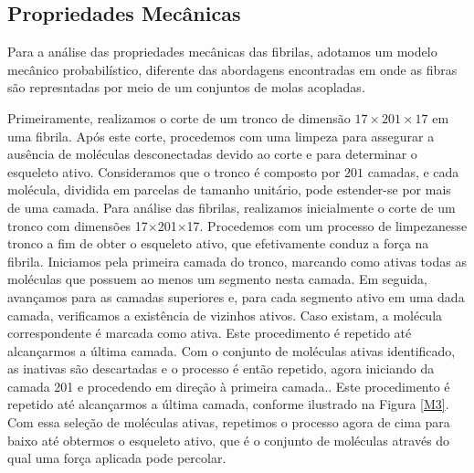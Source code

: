 \documentclass{article}
\begin{document}
    \subsection{Propriedades Mecânicas} 

        \indent Para a análise das propriedades mecânicas das fibrilas, adotamos um modelo mecânico probabilístico\cite{Parkinson1997}, 
        diferente das abordagens encontradas em \cite{Saitoh2020MolecularDS} onde as fibras são represntadas por meio de um conjuntos de 
        molas acopladas.
        
        Primeiramente, realizamos o corte de um tronco de dimensão \(17 \times 201 \times 17\) em uma fibrila. Após este 
        corte, procedemos com uma limpeza para assegurar a ausência de moléculas desconectadas devido ao corte e para 
        determinar o esqueleto ativo. Consideramos que o tronco é composto por \(201\) camadas, e cada molécula, dividida 
        em parcelas de tamanho unitário, pode estender-se por mais de uma camada. Para análise das fibrilas, realizamos 
        inicialmente o corte de um tronco com dimensões 17×201×17. Procedemos com um processo de limpezanesse tronco a fim 
        de obter o esqueleto ativo, que efetivamente conduz a força na fibrila. Iniciamos pela primeira camada do tronco, 
        marcando como ativas todas as moléculas que possuem ao menos um segmento nesta camada. Em seguida, avançamos para 
        as camadas superiores e, para cada segmento ativo em uma dada camada, verificamos a existência de vizinhos ativos. 
        Caso existam, a molécula correspondente é marcada como ativa. Este procedimento é repetido até alcançarmos a última 
        camada. Com o conjunto de moléculas ativas identificado, as inativas são descartadas e o processo é então repetido, 
        agora iniciando da camada 201 e procedendo em direção à primeira camada.. Este procedimento é repetido até alcançarmos a última camada, conforme 
        ilustrado na Figura \ref{M3}. Com essa seleção de moléculas ativas, repetimos o processo agora de cima para baixo 
        até obtermos o esqueleto ativo, que é o conjunto de moléculas através do qual uma força aplicada pode percolar. 
\end{document}
